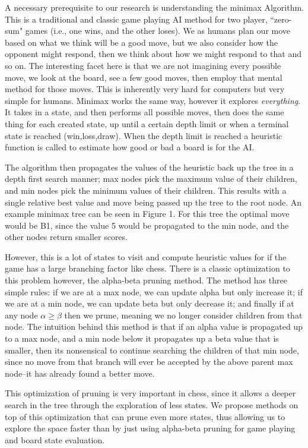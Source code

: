 \documentclass[letterpaper]{article}
\begin{document}
A necessary prerequisite to our research is understanding the minimax Algorithm. This is a traditional and classic game playing AI method for two player, ``zero-sum" games (i.e., one wins, and the other loses). We as humans plan our move based on what we think will be a good move, but we also consider how the opponent might respond, then we think about how we might respond to that and so on. The interesting facet here is that we are not imagining every possible move, we look at the board, see a few good moves, then employ that mental method for those moves. This is inherently very hard for computers but very simple for humans.  Minimax works the same way, however it explores \textit{everything}. It takes in a state, and then performs all possible moves, then does the same thing for each created state, up until a certain depth limit or when a terminal state is reached (win,loss,draw). When the depth limit is reached a heuristic function is called to estimate how good or bad a board is for the AI.

The algorithm then propagates the values of the heuristic back up the tree in a depth first search manner; max nodes pick the maximum value of their children, and min nodes pick the minimum values of their children. This results with a single relative best value and move being passed up the tree to the root node. An example minimax tree can be seen in Figure 1. For this tree the optimal move would be B1, since the value 5 would be propagated to the min node, and the other nodes return smaller scores.

However, this is a lot of states to visit and compute heuristic values for if the game has a large branching factor like chess. There is a classic optimization to this problem however, the alpha-beta pruning method. The method has three simple rules: if we are at a max node, we can update alpha but only increase it; if we are at a min node, we can update beta but only decrease it; and finally if at any node $\alpha \geq \beta$ then we prune, meaning we no longer consider children from that node. The intuition behind this method is that if an alpha value is propagated up to a max node, and a min node below it propagates up a beta value that is smaller, then its nonsensical to continue searching the children of that min node, since no move from that branch will ever be accepted by the above parent max node--it has already found a better move. 

This optimization of pruning is very important in chess, since it allows a deeper search in the tree through the exploration of less states. We propose methods on top of this optimization that can prune even more states, thus allowing us to explore the space faster than by just using alpha-beta pruning for game playing and board state evaluation. 
\end{document}
